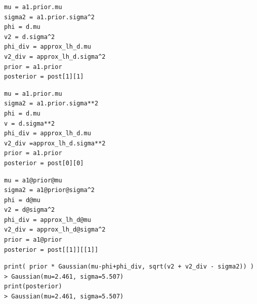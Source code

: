 \documentclass[a4paper,10pt]{book}
\theoremstyle{definition}
\newif\ifen
\newif\ifes
\newcommand{\en}[1]{\ifen#1\fi}
\newcommand{\es}[1]{\ifes#1\fi}
\begin{document}
%
\begin{lstlisting}[backgroundcolor=\color{white}, label=lst:posterior_s1_approx, caption={\en{Accessing the approximate posterior}\es{Accediendo al posterior aproximado}}, belowskip=-1.0 \baselineskip, aboveskip=-0 \baselineskip]
\end{lstlisting}
\begin{paracol}{3}
\begin{lstlisting}[backgroundcolor=\color{julia!60},belowskip=-0.77 \baselineskip]
mu = a1.prior.mu
sigma2 = a1.prior.sigma^2
phi = d.mu
v2 = d.sigma^2
phi_div = approx_lh_d.mu
v2_div = approx_lh_d.sigma^2
prior = a1.prior
posterior = post[1][1]
\end{lstlisting}
\switchcolumn
\begin{lstlisting}[backgroundcolor=\color{python!60},belowskip=-0.77 \baselineskip]
mu = a1.prior.mu
sigma2 = a1.prior.sigma**2
phi = d.mu
v = d.sigma**2
phi_div = approx_lh_d.mu
v2_div =approx_lh_d.sigma**2
prior = a1.prior
posterior = post[0][0]
\end{lstlisting}
\switchcolumn
\begin{lstlisting}[backgroundcolor=\color{r!50},belowskip=-0.77 \baselineskip]
mu = a1@prior@mu
sigma2 = a1@prior@sigma^2
phi = d@mu
v2 = d@sigma^2
phi_div = approx_lh_d@mu
v2_div = approx_lh_d@sigma^2
prior = a1@prior
posterior = post[[1]][[1]]
\end{lstlisting}
\end{paracol}
\begin{lstlisting}[backgroundcolor=\color{all},belowskip=0.0 \baselineskip]
print( prior * Gaussian(mu-phi+phi_div, sqrt(v2 + v2_div - sigma2)) )
> Gaussian(mu=2.461, sigma=5.507)
print(posterior)
> Gaussian(mu=2.461, sigma=5.507)
\end{lstlisting}
%
\en{with \texttt{a1}, \texttt{d}, and \texttt{approx\_lh\_d} computed in codes \ref{lst:player}, \ref{lst:difference_performance}, and \ref{lst:d_div}. }%
\es{con \texttt{a1}, \texttt{d} y \texttt{approx\_lh\_d} computadas en los c\'odigos \ref{lst:player}, \ref{lst:difference_performance} y \ref{lst:d_div}. }%
%
\en{The obtained posterior is the same as the one returned by the \texttt{Gaussian} class. }%
\es{Se puede ver que el posterior que nosotros hemos computado es el mismo que devuelve la clase \texttt{Gaussian}. }%

\subsection{\en{Multiple Teams}} \label{sec:iterative_posterior} 
\end{document}
